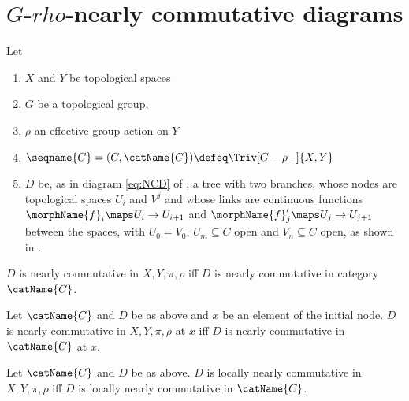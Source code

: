 \documentclass{article}
\begin{document}
\section{$G$-$rho$-nearly commutative diagrams}
\label{sec:grhoncd}
Let
\begin{enumerate}
\item
$X$ and $Y$ be topological spaces
\item
$G$ be a topological group,
\item
$\rho$ an effective group action on $Y$
\item
$\seqname{C}=(C,\catName{C}) \defeq \Triv[G-\rho-]{X,Y}$
\item
$D$ be, as in diagram \eqref{eq:NCD} of \pageref{part:ncd}, a tree with
two branches, whose nodes are topological spaces $U_i$ and $V^j$ and
whose links are continuous functions $\morphName{f}_i \maps U_i \to
U_{i+1}$ and $\morphName{f}'_j \maps U_j \to U_{j+1}$ between the spaces,
with $U_0 = V_0$, $U_m \subseteq C$ open and $V_n \subseteq C$ open, as
shown in .
\end{enumerate}

\begin{definition}
$D$ is nearly commutative in $X,Y,\pi,\rho$ iff $D$ is nearly
commutative in category $\catName{C}$.
\end{definition}

\begin{definition}
\label{def:grhoNCD}
Let $\catName{C}$ and $D$ be as above and $x$ be an element of the
initial node. $D$ is nearly commutative in $X,Y,\pi,\rho$ at $x$ iff
$D$ is nearly commutative in $\catName{C}$ at $x$.
\end{definition}

\begin{definition}
Let $\catName{C}$ and $D$ be as above. $D$ is locally nearly commutative
in $X,Y,\pi,\rho$ iff $D$ is locally nearly commutative in
$\catName{C}$.
\end{definition}
\end{document}

